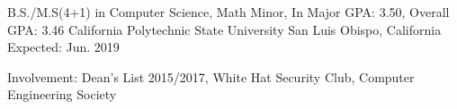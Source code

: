 


\begin{cventries}


\cventry
{B.S./M.S(4+1) in Computer Science, Math Minor, In Major GPA: 3.50, Overall GPA: 3.46} %
{California Polytechnic State University} %
{San Luis Obispo, California} %
{Expected: Jun. 2019} %
{ %
\begin{cvitems}
\item {Involvement: Dean's List 2015/2017, White Hat Security Club, Computer Engineering Society }
\end{cvitems}
}


\end{cventries}
